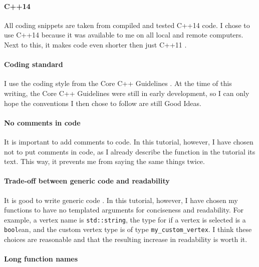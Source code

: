 \paragraph{C++14}

All coding snippets are taken from compiled and tested C++14 code.
I chose to use C++14 because it was available to me on all local and remote
computers.
Next to this, it makes code even shorter then just C++11 .

\paragraph{Coding standard}

I use the coding style from the 
Core C++ Guidelines .
At the time of this writing, the Core C++ Guidelines were still in early
development, so I can only hope the conventions I then chose to follow
are still Good Ideas.

\paragraph{No comments in code}

It is important to add comments to code.
In this tutorial, however, I have chosen not to put comments in code, 
as I already describe the function in the tutorial its text.
This way, it prevents me from saying the same things twice.

\paragraph{Trade-off between generic code and readability}

It is good to write generic code .
In this tutorial, however, I have chosen my functions to have 
no templated arguments  
for conciseness and readability.
For example, a vertex name is \verb;std::string;, 
the type for if a vertex is selected is a \verb;bool;ean, 
and the custom vertex type is of type \verb;my_custom_vertex;.
I think these choices are reasonable and that the resulting increase in
readability is worth it.

\paragraph{Long function names}

